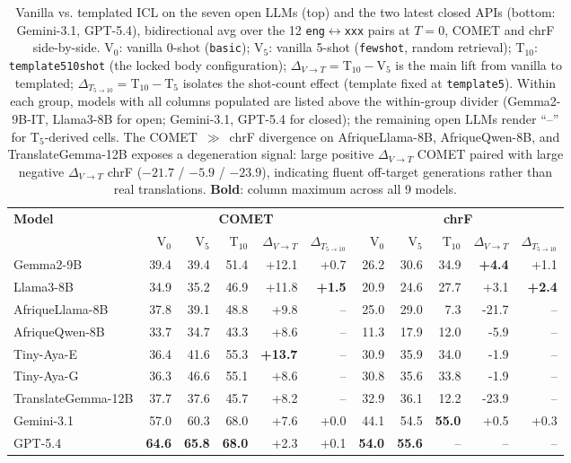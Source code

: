\begin{table}[t]
\centering
\small
\setlength{\tabcolsep}{4pt}
\renewcommand{\arraystretch}{1.05}
\begin{tabular}{lrrrrrrrrrr}
\toprule
\textbf{Model} & \multicolumn{5}{c}{\textbf{COMET}} & \multicolumn{5}{c}{\textbf{chrF}} \\
\cmidrule(lr){2-6}\cmidrule(lr){7-11}
 & V$_0$ & V$_5$ & T$_{10}$ & $\Delta_{V\to T}$ & $\Delta_{T_{5\to 10}}$ & V$_0$ & V$_5$ & T$_{10}$ & $\Delta_{V\to T}$ & $\Delta_{T_{5\to 10}}$ \\
\midrule
Gemma2-9B & 39.4 & 39.4 & 51.4 & +12.1 & +0.7 & 26.2 & 30.6 & 34.9 & \textbf{+4.4} & +1.1 \\
Llama3-8B & 34.9 & 35.2 & 46.9 & +11.8 & \textbf{+1.5} & 20.9 & 24.6 & 27.7 & +3.1 & \textbf{+2.4} \\
\cmidrule(lr){1-11}
AfriqueLlama-8B & 37.8 & 39.1 & 48.8 & +9.8 & -- & 25.0 & 29.0 & 7.3 & -21.7 & -- \\
AfriqueQwen-8B & 33.7 & 34.7 & 43.3 & +8.6 & -- & 11.3 & 17.9 & 12.0 & -5.9 & -- \\
Tiny-Aya-E & 36.4 & 41.6 & 55.3 & \textbf{+13.7} & -- & 30.9 & 35.9 & 34.0 & -1.9 & -- \\
Tiny-Aya-G & 36.3 & 46.6 & 55.1 & +8.6 & -- & 30.8 & 35.6 & 33.8 & -1.9 & -- \\
TranslateGemma-12B & 37.7 & 37.6 & 45.7 & +8.2 & -- & 32.9 & 36.1 & 12.2 & -23.9 & -- \\
\midrule
Gemini-3.1 & 57.0 & 60.3 & 68.0 & +7.6 & +0.0 & 44.1 & 54.5 & \textbf{55.0} & +0.5 & +0.3 \\
\cmidrule(lr){1-11}
GPT-5.4 & \textbf{64.6} & \textbf{65.8} & \textbf{68.0} & +2.3 & +0.1 & \textbf{54.0} & \textbf{55.6} & -- & -- & -- \\
\bottomrule
\end{tabular}
\caption{Vanilla vs. templated ICL on the seven open LLMs (top) and the two latest closed APIs (bottom: Gemini-3.1, GPT-5.4), bidirectional avg over the 12 \texttt{eng}$\leftrightarrow$\texttt{xxx} pairs at $T{=}0$, COMET and chrF side-by-side. V$_0$: vanilla 0-shot (\texttt{basic}); V$_5$: vanilla 5-shot (\texttt{few\textunderscore{}shot}, random retrieval); T$_{10}$: \texttt{template5\textunderscore{}10shot} (the locked body configuration); $\Delta_{V\to T} = $T$_{10} - $V$_5$ is the main lift from vanilla to templated; $\Delta_{T_{5\to 10}} = $T$_{10} - $T$_5$ isolates the shot-count effect (template fixed at \texttt{template5}). Within each group, models with all columns populated are listed above the within-group divider (Gemma2-9B-IT, Llama3-8B for open; Gemini-3.1, GPT-5.4 for closed); the remaining open LLMs render ``--'' for T$_5$-derived cells. The COMET~$\gg$~chrF divergence on AfriqueLlama-8B, AfriqueQwen-8B, and TranslateGemma-12B exposes a degeneration signal: large positive $\Delta_{V\to T}$ COMET paired with large negative $\Delta_{V\to T}$ chrF ($-21.7$ / $-5.9$ / $-23.9$), indicating fluent off-target generations rather than real translations. \textbf{Bold}: column maximum across all 9 models.}
\label{tab:prompt_engineering_open}
\end{table}

